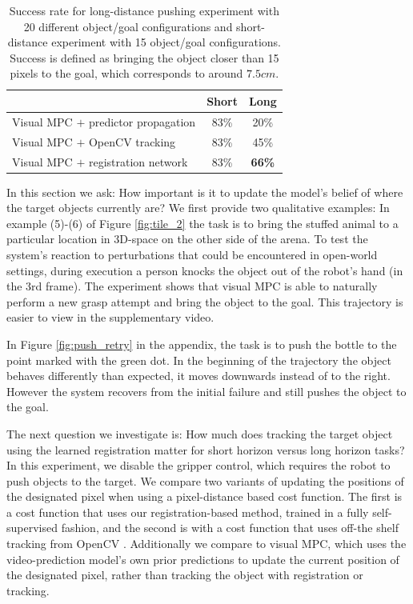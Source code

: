 \begin{table}
	{\footnotesize
		\begin{center}
			\begin{tabular}{lcc}
				\toprule
				& Short & Long \\
				\midrule
				Visual MPC $+$ predictor propagation  & 83\% & 20\% \\
				Visual MPC $+$ OpenCV tracking  & 83\%  & 45\% \\
				Visual MPC $+$ registration network & 83\% & \textbf{66\%}  \\
				\bottomrule
			\end{tabular}
		\end{center}
	}
	\caption{\small Success rate for long-distance pushing experiment with 20 different object/goal configurations and short-distance experiment with 15 object/goal configurations. Success is defined as bringing the object closer than 15 pixels to the goal, which corresponds to around $7.5cm$.}
	\label{table:res_long_short}
\end{table}
In this section we ask: How important  is it to update the model's belief of where the target objects currently are? 
We first provide two qualitative examples: In example (5)-(6) of Figure \ref{fig:tile_2} the task is to bring the stuffed animal to a particular location in 3D-space on the other side of the arena. To test the system's reaction to perturbations that could be encountered in open-world settings, during execution a person knocks the object out of the robot's hand (in the 3rd frame). The experiment shows that visual MPC is able to naturally perform a new grasp attempt and bring the object to the goal. This trajectory is easier to view in the supplementary video.

In Figure \ref{fig:push_retry} in the appendix, the task is to push the bottle to the point marked with the green dot. In the beginning of the trajectory the object behaves differently than expected, it moves downwards instead of to the right. However the system recovers from the initial failure and still pushes the object to the goal.

The next question we investigate is: How much does tracking the target object using the learned registration matter for short horizon versus long horizon tasks? 
In this experiment, we disable the gripper control, which requires the robot to push objects to the target. We compare two variants of updating the positions of the designated pixel when using a pixel-distance based cost function. The first is a cost function that uses our registration-based method, trained in a fully self-supervised fashion, and the second is with a cost function that uses off-the shelf tracking from OpenCV \cite{babenko2009visual}. Additionally we compare to visual MPC,
which uses the video-prediction model's own prior predictions to update the current position of the designated pixel, rather than tracking the object with registration or tracking.

